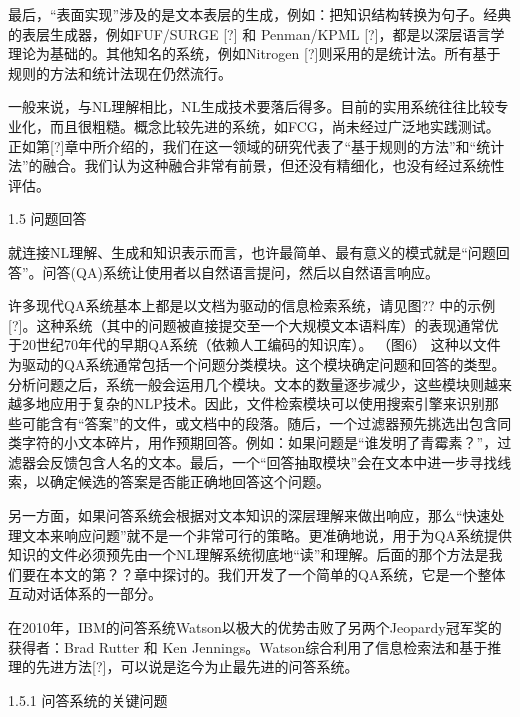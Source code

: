 最后，“表面实现”涉及的是文本表层的生成，例如：把知识结构转换为句子。经典的表层生成器，例如FUF/SURGE [?] 和 Penman/KPML [?]，都是以深层语言学理论为基础的。其他知名的系统，例如Nitrogen [?]则采用的是统计法。所有基于规则的方法和统计法现在仍然流行。

一般来说，与NL理解相比，NL生成技术要落后得多。目前的实用系统往往比较专业化，而且很粗糙。概念比较先进的系统，如FCG，尚未经过广泛地实践测试。正如第[?]章中所介绍的，我们在这一领域的研究代表了“基于规则的方法”和“统计法”的融合。我们认为这种融合非常有前景，但还没有精细化，也没有经过系统性评估。

1.5 问题回答

就连接NL理解、生成和知识表示而言，也许最简单、最有意义的模式就是“问题回答”。问答(QA)系统让使用者以自然语言提问，然后以自然语言响应。


许多现代QA系统基本上都是以文档为驱动的信息检索系统，请见图?? 中的示例[?]。这种系统（其中的问题被直接提交至一个大规模文本语料库）的表现通常优于20世纪70年代的早期QA系统（依赖人工编码的知识库）。
（图6）
这种以文件为驱动的QA系统通常包括一个问题分类模块。这个模块确定问题和回答的类型。分析问题之后，系统一般会运用几个模块。文本的数量逐步减少，这些模块则越来越多地应用于复杂的NLP技术。因此，文件检索模块可以使用搜索引擎来识别那些可能含有“答案”的文件，或文档中的段落。随后，一个过滤器预先挑选出包含同类字符的小文本碎片，用作预期回答。例如：如果问题是“谁发明了青霉素？”，过滤器会反馈包含人名的文本。最后，一个“回答抽取模块”会在文本中进一步寻找线索，以确定候选的答案是否能正确地回答这个问题。

另一方面，如果问答系统会根据对文本知识的深层理解来做出响应，那么“快速处理文本来响应问题”就不是一个非常可行的策略。更准确地说，用于为QA系统提供知识的文件必须预先由一个NL理解系统彻底地“读”和理解。后面的那个方法是我们要在本文的第？？章中探讨的。我们开发了一个简单的QA系统，它是一个整体互动对话体系的一部分。

在2010年，IBM的问答系统Watson以极大的优势击败了另两个Jeopardy冠军奖的获得者：Brad Rutter 和 Ken Jennings。Watson综合利用了信息检索法和基于推理的先进方法[?]，可以说是迄今为止最先进的问答系统。

1.5.1  问答系统的关键问题


